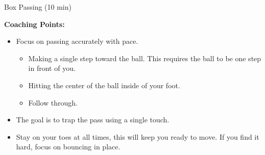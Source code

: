 \begin{oddBlock}{Box Passing (10 min)}
\begin{minipage}[t]{\linewidth}
\begin{minipage}{.6\linewidth}
        \textbf{Coaching Points:}
        \begin{itemize}
        \setlength{\itemsep}{0pt}
        \setlength{\parskip}{0pt}
        \setlength{\parsep}{0pt}
        \item Focus on passing accurately with pace.
        \begin{itemize}
            \item Making a single step toward the ball.  This requires the ball to be one step in front of you.
            \item Hitting the center of the ball inside of your foot.
            \item Follow through.
        \end{itemize} 
        \item The goal is to trap the pass using a single touch.
        \item Stay on your toes at all times, this will keep you ready to move.  If you find it hard, focus on bouncing in place.
        \end{itemize}

    \end{minipage}
\end{minipage}

\end{oddBlock}